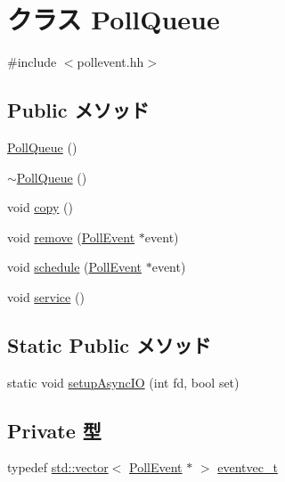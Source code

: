 \hypertarget{classPollQueue}{
\section{クラス PollQueue}
\label{classPollQueue}
}


{\ttfamily \#include $<$pollevent.hh$>$}\subsection*{Public メソッド}
\begin{DoxyCompactItemize}
\item 
\hyperlink{classPollQueue_a70b9f304ac808c76af92b819c8a1f2b8}{PollQueue} ()
\item 
\hyperlink{classPollQueue_a39f4757a20213ab29760d486254dab55}{$\sim$PollQueue} ()
\item 
void \hyperlink{classPollQueue_aaa6c087511a52e64fc9ad92820c7c0a8}{copy} ()
\item 
void \hyperlink{classPollQueue_a4b43e98813c26772adf0d7488dfa1887}{remove} (\hyperlink{classPollEvent}{PollEvent} $\ast$event)
\item 
void \hyperlink{classPollQueue_a3f09bc14c53cce046dfdc7d11c96bb72}{schedule} (\hyperlink{classPollEvent}{PollEvent} $\ast$event)
\item 
void \hyperlink{classPollQueue_a365151ef4fcb2b1052b77c2d493399d3}{service} ()
\end{DoxyCompactItemize}
\subsection*{Static Public メソッド}
\begin{DoxyCompactItemize}
\item 
static void \hyperlink{classPollQueue_a146cc6e8e860e0fba81d4ed2b58432c7}{setupAsyncIO} (int fd, bool set)
\end{DoxyCompactItemize}
\subsection*{Private 型}
\begin{DoxyCompactItemize}
\item 
typedef \hyperlink{classstd_1_1vector}{std::vector}$<$ \hyperlink{classPollEvent}{PollEvent} $\ast$ $>$ \hyperlink{classPollQueue_a00fb40260dd4f32af4f844fc9f4dfcc0}{eventvec\_\-t}
\end{DoxyCompactItemize}
